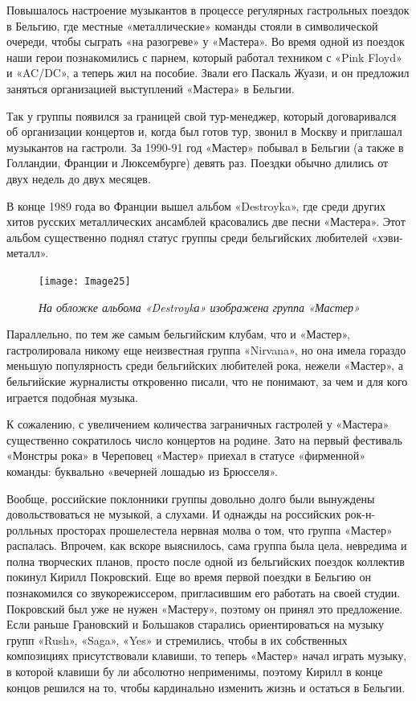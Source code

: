 \documentclass[16pt,a5paper,oneside]{book}
\begin{document}
Повышалось настроение музыкантов в процессе регулярных гастрольных поездок в Бельгию, где местные «металлические»
команды стояли в символической очереди, чтобы сыграть «на разогреве» у «Мастера». Во время одной из поездок наши герои
познакомились с парнем, который работал техником с «Pink Floyd» и «AC/DC», а теперь жил на пособие. Звали его Паскаль
Жуази, и он предложил заняться организацией выступлений «Мастера» в Бельгии.

Так у группы появился за границей свой тур-менеджер, который договаривался об организации концертов и, когда был готов
тур, звонил в Москву и приглашал музыкантов на гастроли. За 1990-91 год «Мастер» побывал в Бельгии (а также в Голландии,
Франции и Люксембурге) девять раз. Поездки обычно длились от двух недель до двух месяцев.

В конце 1989 года во Франции вышел альбом «Destroyka», где среди других хитов русских металлических ансамблей
красовались две песни «Мастера». Этот альбом существенно поднял статус группы среди бельгийских любителей «хэви-металл».

\begin{figure}
    \centering
    \texttt{[image: Image25]}
    \caption{\textit{На обложке альбома «Destroykа» изображена группа «Мастер»}}
\end{figure}

Параллельно, по тем же самым бельгийским клубам, что и «Мастер», гастролировала никому еще неизвестная группа «Nirvana»,
но она имела гораздо меньшую популярность среди бельгийских любителей рока, нежели «Мастер», а бельгийские журналисты
откровенно писали, что не понимают, за чем и для кого играется подобная музыка.

К сожалению, с увеличением количества заграничных гастролей у «Мастера» существенно сократилось число концертов на
родине. Зато на первый фестиваль «Монстры рока» в Череповец «Мастер» приехал в статусе «фирменной» команды: буквально
«вечерней лошадью из Брюсселя».

Вообще, российские поклонники группы довольно долго были вынуждены довольствоваться не музыкой, а слухами. И однажды на
российских рок-н-ролльных просторах прошелестела нервная молва о том, что группа «Мастер» распалась. Впрочем, как вскоре
выяснилось, сама группа была цела, невредима и полна творческих планов, просто после одной из бельгийских поездок
коллектив покинул Кирилл Покровский. Еще во время первой поездки в Бельгию он познакомился со звукорежиссером,
пригласившим его работать на своей студии. Покровский был уже не нужен «Мастеру», поэтому он принял это предложение.
Если раньше Грановский и Большаков старались ориентироваться на музыку групп «Rush», «Saga», «Yes» и стремились, чтобы в
их собственных композициях присутствовали клавиши, то теперь «Мастер» начал играть музыку, в которой клавиши бу ли
абсолютно неприменимы, поэтому Кирилл в конце концов решился на то, чтобы кардинально изменить жизнь и остаться в
Бельгии.
\end{document}

